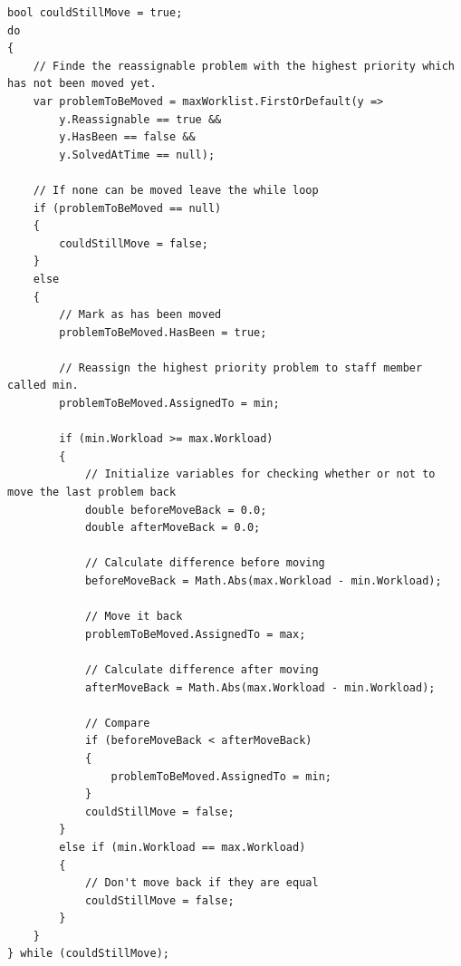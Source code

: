 \begin{lstlisting}[style=sourceCode, caption=\myCaption{A code snippet of the balance workload method. The presented code is within a for loop running for each staff member minus one. ``min'' and ``max'' are the person objects of which the algorithm are currently moving problems between. \vari{maxWorklistist} a sorted worklist. It is sorted in non-deacreasing order according to the estimated time consumption. }, label=lst:balanceWorkload]
bool couldStillMove = true;
do
{
    // Finde the reassignable problem with the highest priority which has not been moved yet. 
    var problemToBeMoved = maxWorklist.FirstOrDefault(y =>
	    y.Reassignable == true &&
	    y.HasBeen == false &&
	    y.SolvedAtTime == null);
                  
    // If none can be moved leave the while loop
    if (problemToBeMoved == null)
    {
        couldStillMove = false;
    }
    else
    {
        // Mark as has been moved
        problemToBeMoved.HasBeen = true;

        // Reassign the highest priority problem to staff member called min.
        problemToBeMoved.AssignedTo = min;

        if (min.Workload >= max.Workload)
        {
            // Initialize variables for checking whether or not to move the last problem back
            double beforeMoveBack = 0.0;
            double afterMoveBack = 0.0;

            // Calculate difference before moving
            beforeMoveBack = Math.Abs(max.Workload - min.Workload);

            // Move it back
            problemToBeMoved.AssignedTo = max;

            // Calculate difference after moving
            afterMoveBack = Math.Abs(max.Workload - min.Workload);

            // Compare
            if (beforeMoveBack < afterMoveBack)
            {
                problemToBeMoved.AssignedTo = min;
            }
            couldStillMove = false;
        }
        else if (min.Workload == max.Workload)
        {
            // Don't move back if they are equal
            couldStillMove = false;
        }
    }
} while (couldStillMove);



\end{lstlisting}


